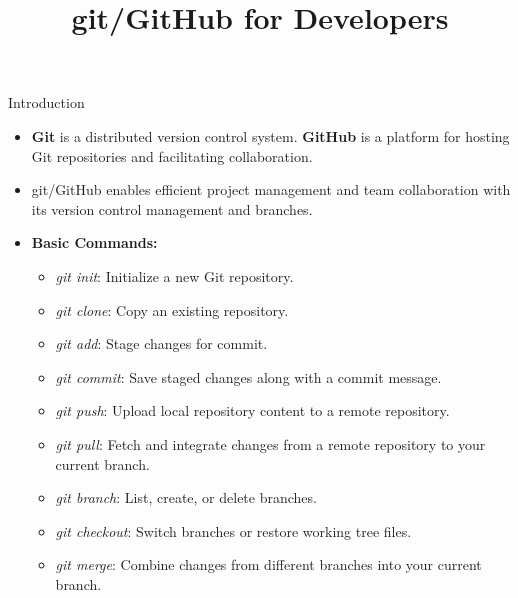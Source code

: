 \documentclass[aspectratio=169]{beamer}
\title{git/GitHub for Developers}
\institute{Engineers for Exploration, UC San Diego}
\begin{document}
\maketitle
\begin{frame}{Introduction}
    \begin{itemize}
        \item \textbf{Git} is a distributed version control system. \textbf{GitHub} is a platform for hosting Git repositories and facilitating collaboration.
        \item git/GitHub enables efficient project management and team collaboration with its version control management and branches.
        \item \textbf{Basic Commands:}
        \begin{itemize}
            \item \textit{git init}: Initialize a new Git repository.
            \item \textit{git clone}: Copy an existing repository.
            \item \textit{git add}: Stage changes for commit.
            \item \textit{git commit}: Save staged changes along with a commit message.
            \item \textit{git push}: Upload local repository content to a remote repository.
            \item \textit{git pull}: Fetch and integrate changes from a remote repository to your current branch.
            \item \textit{git branch}: List, create, or delete branches.
            \item \textit{git checkout}: Switch branches or restore working tree files.
            \item \textit{git merge}: Combine changes from different branches into your current branch.
        \end{itemize}
    \end{itemize}
\end{frame}
\end{document}
